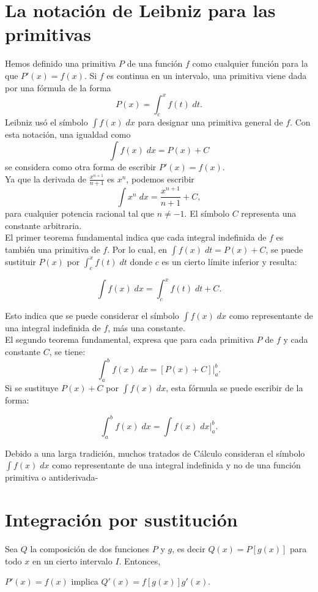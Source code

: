 \section{La notación de Leibniz para las primitivas}
Hemos definido una primitiva $P$ de una función $f$ como cualquier función para la que $P'(x)=f(x).$ Si $f$ es continua en un intervalo, una primitiva viene dada por una fórmula de la forma
$$P(x)=\int_c^x f(t)\; dt.$$
Leibniz usó el símbolo $\int f(x)\; dx$ para designar una primitiva general de $f$. Con esta notación, una igualdad como
$$\int f(x)\; dx=P(x)+C$$
se considera como otra forma de escribir $P'(x)=f(x).$\\

Ya que la derivada de $\frac{x^{n+1}}{n+1}$ es $x^n$, podemos escribir
$$\int x^n \; dx = \dfrac{x^{n+1}}{n+1}+C,$$
para cualquier potencia racional tal que $n\neq -1$. El símbolo $C$ representa una constante arbitraria.\\

El primer teorema fundamental indica que cada integral indefinida de $f$ es también una primitiva de $f$. Por lo cual, en $\int f(x)\; dt=P(x)+C$, se puede sustituir $P(x)$ por $\int_c^x f(t)\;dt$ donde $c$ es un cierto límite inferior y resulta:
\begin{tcolorbox}[colback=black!3,colframe=white]
$$\int f(x)\; dx=\int_c^x f(t)\; dt + C.$$
\end{tcolorbox}
Esto indica que se puede considerar el símbolo $\int f(x)\; dx$ como representante de una integral indefinida de $f$, más una constante.\\

El segundo teorema fundamental, expresa que para cada primitiva $P$ de $f$ y cada constante $C$, se tiene:
$$\int_a^b f(x)\; dx = \left[P(x)+C\right]\bigg|_a^b.$$
Si se sustituye $P(x)+C$ por $\int f(x)\; dx$, esta fórmula se puede escribir de la forma:
\begin{tcolorbox}[colback=black!3,colframe=white]
$$\int_a^b f(x)\; dx = \int f(x)\; dx \bigg|_a^b.$$
\end{tcolorbox}

Debido a una larga tradición, muchos tratados de Cálculo consideran el símbolo $\int f(x)\; dx$ como representante de una integral indefinida y no de una función primitiva o antiderivada-


\section{Integración por sustitución}
Sea $Q$ la composición de dos funciones $P$ y $g$, es decir $Q(x)=P[g(x)]$ para todo $x$ en un cierto intervalo $I$. Entonces,
\begin{center}
    $P'(x)=f(x)$ implica $Q'(x)=f[g(x)]g'(x)$.
\end{center}


